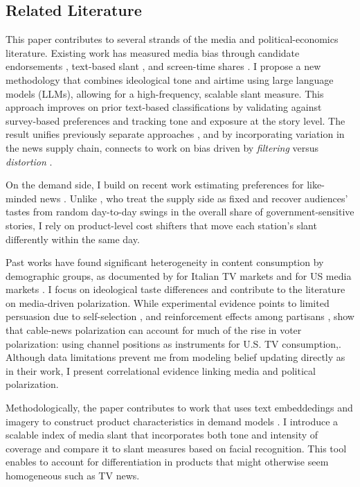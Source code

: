 \documentclass[12pt]{article}
\begin{document}
\subsection*{Related Literature}


This paper contributes to several strands of the media and political-economics literature. Existing work has measured media bias through candidate endorsements \citep{ChiangKnight2011}, text-based slant \citep{gentzkow2010media,GentzkowShapiroTaddy2019}, and screen-time shares \citep{durante2012partisan,CageHengelHerveUrvoy2022}. I propose a new methodology that combines ideological tone and airtime using large language models (LLMs), allowing for a high-frequency, scalable slant measure. This approach improves on prior text-based classifications by validating against survey-based preferences and tracking tone and exposure at the story level. The result unifies previously separate approaches \citep{puglisi_review}, and by incorporating variation in the news supply chain, connects to work on bias driven by \emph{filtering} versus \emph{distortion} \citep{gentzkow2014media}.


On the demand side, I build on recent work estimating preferences for like-minded news \citep{SimonovRao2022,gentzkow2010media}. Unlike \cite{SimonovRao2022}, who treat the supply side as fixed and recover audiences’ tastes from random day-to-day swings in the overall share of government-sensitive stories, I  rely on product-level cost shifters that move each station’s slant differently within the same day. 


Past works have found significant heterogeneity in content consumption by demographic groups, as documented by \citet{gambaro2021revealed} for Italian TV markets and for US media markets \citep{bang2023, BangSieg2025}. I focus on ideological taste differences and contribute to the literature on media-driven polarization. While experimental evidence points to limited persuasion due to self-selection \citep{arceneaux_johnson_2013}, and reinforcement effects among partisans \citep{levendusky}, \citet{martin2017} show that cable-news polarization can account for much of the rise in voter polarization: using channel positions as instruments for U.S. TV consumption,. Although data limitations prevent me from modeling belief updating directly as in their work, I present correlational evidence linking media and political polarization.

Methodologically, the paper contributes to work that uses text embeddedings  and imagery to construct product characteristics in demand models \citep{compiani2025demandestimationtextimage}. I introduce a scalable index of media slant that incorporates both tone and intensity of coverage and compare it to slant measures based on facial recognition. This tool enables to account for differentiation in products that might otherwise seem homogeneous such as TV news. 
\end{document}

